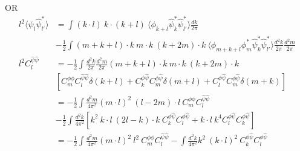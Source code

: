 \documentclass[noinfoline]{imsart}
\newcommand{\sinv}{\hat\psi}
\begin{document}
OR
\begin{align}
    l^2 \langle \sinv_l \sinv_{l'}^* \rangle
  &= \int (k\cdot l) \ k\cdot(k+l)\
  \langle \phi_{k+l} \sinv_k^* \sinv_{l'}^* \rangle \frac{dk}{2\pi}  \nonumber\\
  & -\frac{1}{2}\int (m+k+l)\cdot k\  m\cdot k \ (k+2m)\cdot k\
  \langle \phi_{m+k+l}\phi_{m}^*\sinv_{k}^* \sinv_{l'}^*\rangle\frac{d^2k}{2\pi}\frac{d^2m}{2\pi}\nonumber \\
  l^2 C_l^{\sinv\sinv}
  &= -\frac{1}{2}\int \frac{d^2k}{2\pi}\frac{d^2m}{2\pi} (m+k+l)\cdot k\  m\cdot k \ (k+2m)\cdot k\nonumber\\
  &\left[C_m^{\phi\phi} C_l^{\sinv\sinv} \delta(k+l) + C_k^{\phi\sinv}C_m^{\phi\sinv} \delta(m+l)
  + C_l^{\phi\sinv}C_m^{\phi\sinv} \delta(m+k)\right] \nonumber \\
  &= -\frac{1}{2}\int \frac{d^2m}{4\pi^2} (m\cdot l)^2 \ (l-2m)\cdot l \ C_m^{\phi\phi} C_l^{\sinv\sinv}\nonumber\\
  &-\frac{1}{2}\int \frac{d^2k}{4\pi^2}\left[ k^2 \ k\cdot l \ (2l-k)\cdot k \ C_k^{\phi\sinv}C_l^{\phi\sinv}
  +  k\cdot l \ k^4 C_l^{\phi\sinv}C_k^{\phi\sinv} \right] \nonumber\\
  &= -\frac{1}{2}\int \frac{d^2m}{4\pi^2} (m\cdot l)^2 \ l^2  \ C_m^{\phi\phi} C_l^{\sinv\sinv}
  - \int \frac{d^2k}{4\pi^2}  k^2 \ (k\cdot l)^2  \ C_k^{\phi\sinv}C_l^{\phi\sinv}  
\end{align}
\end{document}
